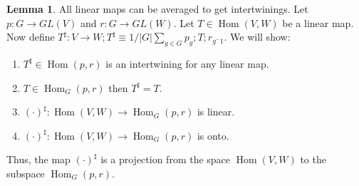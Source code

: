 \documentclass{book}
\newcommand{\Hom}{\operatorname{Hom}}
\theoremstyle{definition}
\newtheorem{lemma}[theorem]{Lemma}
\begin{document}
\begin{lemma}
All linear maps can be averaged to get intertwinings. Let $p: G \rightarrow GL(V)$
and $r: G \rightarrow GL(W)$. Let $T \in \Hom(V, W)$ be a linear map. Now
define $T^\sharp: V \rightarrow W;  T^\sharp \equiv 1/|G| \sum_{g \in G} p_g; T; r_{g^-1}$.
We will show:
\begin{enumerate}
\item $T^\sharp \in \Hom(p, r)$ is an intertwining for any linear map.
\item $T \in \Hom_G(p, r)$ then $T^\sharp = T$.
\item $( \cdot )^\sharp : \Hom(V, W) \rightarrow  \Hom_G(p, r)$ is linear.
\item $( \cdot )^\sharp : \Hom(V, W) \rightarrow  \Hom_G(p, r)$ is onto.
\end{enumerate}

Thus, the map $( \cdot)^\sharp$ is a projection from the space $\Hom(V, W)$ to the
subspace $\Hom_G(p, r)$.
\end{lemma}
\end{document}
